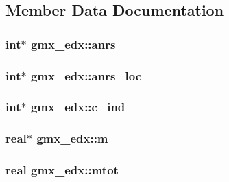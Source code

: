\subsection{\-Member \-Data \-Documentation}
\hypertarget{structgmx__edx_a8123a5a962388d22c0e0e756389c7cd5}{
\subsubsection[{anrs}]{\setlength{\rightskip}{0pt plus 5cm}int$\ast$ {\bf gmx\-\_\-edx\-::anrs}}}\label{structgmx__edx_a8123a5a962388d22c0e0e756389c7cd5}
\hypertarget{structgmx__edx_afddeab964a2c237f27164c40da3c2f56}{
\subsubsection[{anrs\-\_\-loc}]{\setlength{\rightskip}{0pt plus 5cm}int$\ast$ {\bf gmx\-\_\-edx\-::anrs\-\_\-loc}}}\label{structgmx__edx_afddeab964a2c237f27164c40da3c2f56}
\hypertarget{structgmx__edx_a9844f702f1459cbe590b8fd29714741d}{
\subsubsection[{c\-\_\-ind}]{\setlength{\rightskip}{0pt plus 5cm}int$\ast$ {\bf gmx\-\_\-edx\-::c\-\_\-ind}}}\label{structgmx__edx_a9844f702f1459cbe590b8fd29714741d}
\hypertarget{structgmx__edx_a40eb4b65f28f529da78aad9929ef1976}{
\subsubsection[{m}]{\setlength{\rightskip}{0pt plus 5cm}real$\ast$ {\bf gmx\-\_\-edx\-::m}}}\label{structgmx__edx_a40eb4b65f28f529da78aad9929ef1976}
\hypertarget{structgmx__edx_ae0d3be10c27c2f924123c4701f3181ae}{
\subsubsection[{mtot}]{\setlength{\rightskip}{0pt plus 5cm}real {\bf gmx\-\_\-edx\-::mtot}}}\label{structgmx__edx_ae0d3be10c27c2f924123c4701f3181ae}
